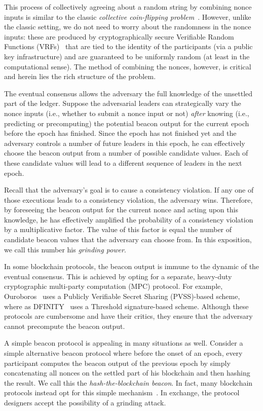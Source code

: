 This process of collectively agreeing about a random string by combining nonce inputs is similar to the classic \emph{collective coin-flipping problem}~\cite{blum-coin-flipping,BL85}. However, 
unlike the classic setting, 
we do not need to worry about the randomness in the nonce inputs: 
these are produced by cryptographically secure Verifiable Random Functions (VRFs)~\cite{VRFMicali,VRFDodis} 
that are tied to the identity of the participants (via a public key infrastructure) and are guaranteed to be uniformly random (at least in the computational sense). 
The method of combining the nonces, however, is critical and herein lies the rich structure of the problem. 

The eventual consensus allows the adversary 
the full knowledge of the unsettled part of the ledger. 
Suppose the adversarial leaders can strategically vary the nonce inputs 
(i.e., whether to submit a nonce input or not)
\emph{after} knowing (i.e., predicting or precomputing) the potential beacon output for the current epoch before the epoch has finished. 
Since the epoch has not finished yet 
and the adversary controls a number of future leaders in this epoch, 
he can effectively choose the beacon output from a number of possible candidate values. 
Each of these candidate values will lead to a different sequence of leaders 
in the next epoch. 

Recall that 
the adversary's goal is to cause a consistency violation. 
If any one of those executions leads to a consistency violation, the adversary wins. 
Therefore, by foreseeing the beacon output for the current nonce and acting upon this knowledge, 
he has effectively amplified the probability of a consistency violation 
by a multiplicative factor. 
The value of this factor is equal the number of candidate beacon values 
that the adversary can choose from. 
In this exposition, we call this number his \emph{grinding power}.

In some blockchain protocols, 
the beacon output is immune to the dynamic of the eventual consensus. 
This is achieved by opting for a separate, heavy-duty cryptographic multi-party computation (MPC) protocol. 
For example, Ouroboros~\cite{Ouroboros} uses 
a Publicly Verifiable Secret Sharing (PVSS)-based scheme, 
where as DFINITY~\cite{DFINITY} uses a Threshold signature-based scheme. 
Although these protocols are cumbersome and have their critics, 
they ensure that the adversary cannot precompute the beacon output. 


A simple beacon protocol is appealing in many situations as well. 
Consider a simple alternative beacon protocol 
where before the onset of an epoch, 
every participant computes the beacon output of the previous epoch by simply 
concatenating all nonces on the settled part of his blockchain and then hashing the result. 
We call this the \emph{hash-the-blockchain beacon}. 
In fact, many blockchain protocols 
instead opt for this simple mechanism~\cite{Praos,SnowWhite,Genesis}. 
In exchange, the protocol designers accept the possibility of a grinding attack. 



